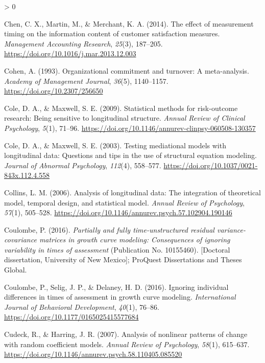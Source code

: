 \documentclass[
12pt, %
twoside,
english]{guelphthesis}
\newlength{\cslhangindent}
\newenvironment{CSLReferences}[2] %
 {%
  \setlength{\parindent}{0pt}
  \ifodd #1 \everypar{\setlength{\hangindent}{\cslhangindent}}\ignorespaces\fi
  \ifnum #2 > 0
  \setlength{\parskip}{\linespacing{2}}
  \fi
 }%
 {}
\begin{document}
\begin{CSLReferences}{1}{0}
\leavevmode{}%
Chen, C. X., Martin, M., \& Merchant, K. A. (2014). The effect of measurement timing on the information content of customer satisfaction measures. \emph{Management Accounting Research}, \emph{25}(3), 187--205. \url{https://doi.org/10.1016/j.mar.2013.12.003}

\leavevmode{}%
Cohen, A. (1993). Organizational commitment and turnover: A meta-analysis. \emph{Academy of Management Journal}, \emph{36}(5), 1140--1157. \url{https://doi.org/10.2307/256650}

\leavevmode{}%
Cole, D. A., \& Maxwell, S. E. (2009). Statistical methods for risk-outcome research: Being sensitive to longitudinal structure. \emph{Annual Review of Clinical Psychology}, \emph{5}(1), 71--96. \url{https://doi.org/10.1146/annurev-clinpsy-060508-130357}

\leavevmode{}%
Cole, D. A., \& Maxwell, S. E. (2003). Testing mediational models with longitudinal data: Questions and tips in the use of structural equation modeling. \emph{Journal of Abnormal Psychology}, \emph{112}(4), 558--577. \url{https://doi.org/10.1037/0021-843x.112.4.558}

\leavevmode{}%
Collins, L. M. (2006). Analysis of longitudinal data: The integration of theoretical model, temporal design, and statistical model. \emph{Annual Review of Psychology}, \emph{57}(1), 505--528. \url{https://doi.org/10.1146/annurev.psych.57.102904.190146}

\leavevmode{}%
Coulombe, P. (2016). \emph{Partially and fully time-unstructured residual variance-covariance matrices in growth curve modeling: Consequences of ignoring variability in times of assessment} (Publication No. 10155460). {[}Doctoral dissertation, University of New Mexico{]}; {ProQuest Dissertations and Theses Global.}

\leavevmode{}%
Coulombe, P., Selig, J. P., \& Delaney, H. D. (2016). Ignoring individual differences in times of assessment in growth curve modeling. \emph{International Journal of Behavioral Development}, \emph{40}(1), 76--86. \url{https://doi.org/10.1177/0165025415577684}

\leavevmode{}%
Cudeck, R., \& Harring, J. R. (2007). Analysis of nonlinear patterns of change with random coefficient models. \emph{Annual Review of Psychology}, \emph{58}(1), 615--637. \url{https://doi.org/10.1146/annurev.psych.58.110405.085520}


\end{CSLReferences}
\end{document}
